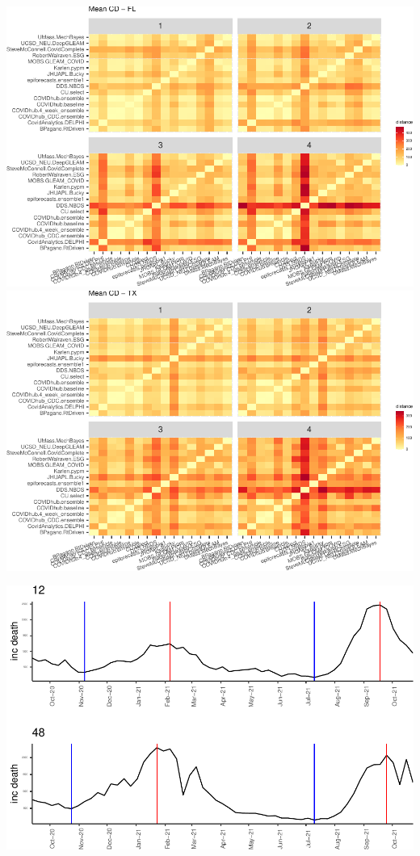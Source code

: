 \documentclass[
]{article}
\begin{document}
\begin{center}\includegraphics{cd_approx_2_files/figure-latex/unnamed-chunk-6-1} \includegraphics{cd_approx_2_files/figure-latex/unnamed-chunk-6-2} \end{center}

\begin{center}\includegraphics{cd_approx_2_files/figure-latex/unnamed-chunk-7-1} \end{center}
\end{document}
